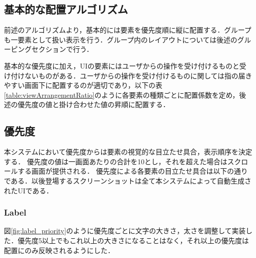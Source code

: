 \subsection{基本的な配置アルゴリズム}
前述のアルゴリズムより，基本的には要素を優先度順に縦に配置する．グループも一要素として扱い表示を行う．グループ内のレイアウトについては後述のグルーピングセクションで行う．

基本的な優先度に加え，UIの要素にはユーザからの操作を受け付けるものと受け付けないものがある．ユーザからの操作を受け付けるものに関しては指の届きやすい画面下に配置するのが適切であり，以下の表\ref{table:viewArrangementRatio}のように各要素の種類ごとに配置係数を定め，後述の優先度の値と掛け合わせた値の昇順に配置する．
\begin{table}[htbp]
\centering
{}
\caption{利用可能な要素一覧}
\label{table:viewArrangementRatio}
\end{table}

\subsection{優先度}
本システムにおいて優先度からは要素の視覚的な目立たせ具合，表示順序を決定する．
優先度の値は一画面あたりの合計を10とし，それを超えた場合はスクロールする画面が提供される．
優先度による各要素の目立たせ具合は以下の通りである．以後登場するスクリーンショットは全て本システムによって自動生成されたUIである．


\subsubsection{Label}
図\ref{fig:label_priority}のように優先度ごとに文字の大きさ，太さを調整して実装した．優先度5以上でもこれ以上の大きさになることはなく，それ以上の優先度は配置にのみ反映されるようにした．

